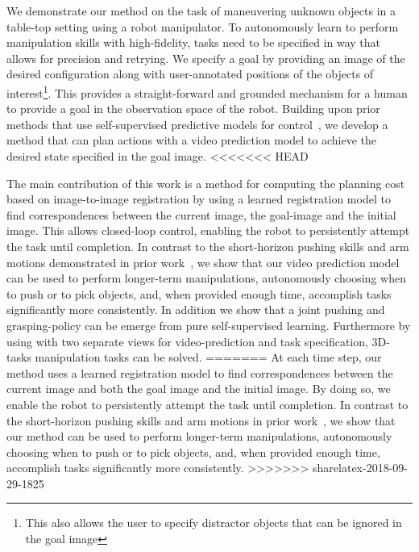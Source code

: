 We demonstrate our method on the task of maneuvering unknown objects in a table-top setting using a robot manipulator. To autonomously learn to perform manipulation skills with high-fidelity, tasks need to be specified in way that allows for precision and retrying. We specify a goal by providing an image of the desired configuration along with user-annotated positions of the objects of interest\footnote{This also allows the user to specify distractor objects that can be ignored in the goal image}. This provides a straight-forward and grounded mechanism for a human to provide a goal in the observation space of the robot.
Building upon prior methods that use self-supervised predictive models for control~\cite{foresight,sna,se3_control}, we develop a method that can plan actions with a video prediction model to achieve the desired state specified in the goal image.
<<<<<<< HEAD

The main contribution of this work is a method for computing the planning cost based on image-to-image registration by using a learned registration model to find correspondences between the current image, the goal-image and the initial image.
This allows closed-loop control, enabling the robot to persistently attempt the task until completion. In contrast to the short-horizon pushing skills and arm motions demonstrated in prior work~\cite{foresight,sna,se3_control}, we show that our video prediction model can be used to perform longer-term manipulations, autonomously choosing when to push or to  pick objects, and, when provided enough time, accomplish tasks significantly more consistently.
In addition we show that a joint pushing and grasping-policy can be emerge from pure self-supervised learning. Furthermore by using with two separate views for video-prediction and task specification, 3D-tasks manipulation tasks can be solved.
=======
At each time step, our method uses a learned registration model to find correspondences between the current image and both the goal image and the initial image.
By doing so, we enable the robot to persistently attempt the task until completion. 
In contrast to the short-horizon pushing skills and arm motions in prior work~\cite{foresight,sna,se3_control}, we show that our method can be used to perform longer-term manipulations, autonomously choosing when to push or to pick objects, and, when provided enough time, accomplish tasks significantly more consistently.
>>>>>>> sharelatex-2018-09-29-1825

